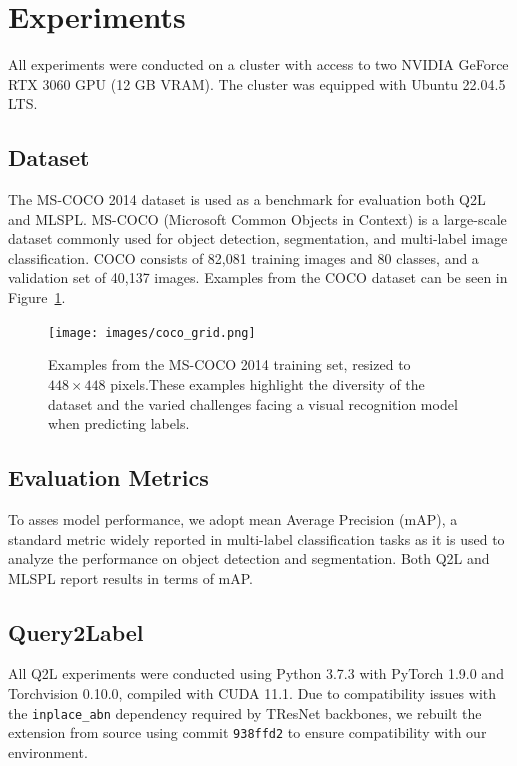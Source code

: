 \documentclass[lettersize,journal]{IEEEtran}
\begin{document}

\section{Experiments}
All experiments were conducted on a cluster with access to two NVIDIA GeForce RTX 3060 GPU (12 GB VRAM). The cluster was equipped with Ubuntu 22.04.5 LTS.

\subsection{Dataset}
The MS-COCO 2014 \cite{coco14} dataset is used as a benchmark for evaluation both Q2L and MLSPL. MS-COCO (Microsoft Common Objects in Context) is a large-scale dataset commonly used for object detection, segmentation, and multi-label image classification. COCO consists of 82,081 training images and 80 classes, and a validation set of 40,137 images. Examples from the COCO dataset can be seen in Figure~\ref{fig:coco-examples}.

\begin{figure}[t]
    \centering
    \texttt{[image: images/coco\_grid.png]}
    \caption{Examples from the MS-COCO 2014 training set, resized to $448 \times 448$ pixels.These examples highlight the diversity of the dataset and the varied challenges facing a visual recognition model when predicting labels.}
    \label{fig:coco-examples}
\end{figure}

\subsection{Evaluation Metrics}
To asses model performance, we adopt mean Average Precision (mAP), a standard metric widely reported in multi-label classification tasks as it is used to analyze the performance on object detection and segmentation. Both Q2L and MLSPL report results in terms of mAP. 

\subsection{Query2Label}
All Q2L experiments were conducted using Python 3.7.3 with PyTorch 1.9.0 and Torchvision 0.10.0, compiled with CUDA 11.1. Due to compatibility issues with the \texttt{inplace\_abn} dependency required by TResNet backbones, we rebuilt the extension from source using commit \texttt{938ffd2} to ensure compatibility with our environment.
\end{document}
